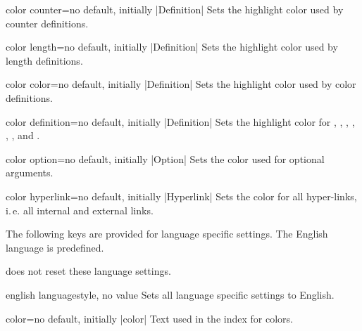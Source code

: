 \begin{docTcbKey}[][doc new={2015-01-08}]{color counter}{=}{no default, initially |Definition|}
  Sets the highlight color used by counter definitions.
\end{docTcbKey}

\begin{docTcbKey}[][doc new={2015-01-08}]{color length}{=}{no default, initially |Definition|}
  Sets the highlight color used by length definitions.
\end{docTcbKey}

\begin{docTcbKey}{color color}{=}{no default, initially |Definition|}
  Sets the highlight color used by color definitions.
\end{docTcbKey}

\begin{docTcbKey}{color definition}{=}{no default, initially |Definition|}
  Sets the highlight color for , ,
  , , ,
  , and .
\end{docTcbKey}

\begin{docTcbKey}{color option}{=}{no default, initially |Option|}
  Sets the color used for optional arguments.
\end{docTcbKey}

\begin{docTcbKey}{color hyperlink}{=}{no default, initially |Hyperlink|}
  Sets the color for all hyper-links, i.\,e. all internal and external links.
\end{docTcbKey}


\clearpage
The following keys are provided for language specific settings.
The English language is predefined.

 does not reset these language settings.

\begin{docTcbKey}{english language}{}{style, no value}
  Sets all language specific settings to English.
\end{docTcbKey}

\begin{langTcbKey}{color}{=}{no default, initially |color|}
  Text used in the index for colors.
\end{langTcbKey}

